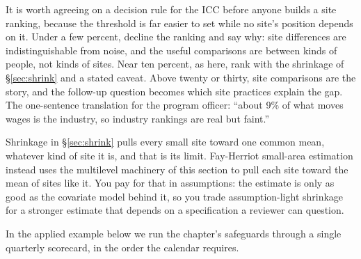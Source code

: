 \documentclass[
    a4paper,
    fontsize=10pt,
    twoside=true,
    numbers=noenddot,
]{kaobook}
\begin{document}
It is worth agreeing on a decision rule for the ICC before anyone builds a site ranking, because the threshold is far easier to set while no site's position depends on it. Under a few percent, decline the ranking and say why: site differences are indistinguishable from noise, and the useful comparisons are between kinds of people, not kinds of sites. Near ten percent, as here, rank with the shrinkage of \S\ref{sec:shrink} and a stated caveat. Above twenty or thirty, site comparisons are the story, and the follow-up question becomes which site practices explain the gap. The one-sentence translation for the program officer: \enquote{about 9\% of what moves wages is the industry, so industry rankings are real but faint.}

Shrinkage in \S\ref{sec:shrink} pulls every small site toward one common mean, whatever kind of site it is, and that is its limit. Fay-Herriot small-area estimation \parencite{fay1979estimates,rao2015small} instead uses the multilevel machinery of this section to pull each site toward the mean of sites like it. You pay for that in assumptions: the estimate is only as good as the covariate model behind it, so you trade assumption-light shrinkage for a stronger estimate that depends on a specification a reviewer can question.

In the applied example below we run the chapter's safeguards through a single quarterly scorecard, in the order the calendar requires.
\end{document}
